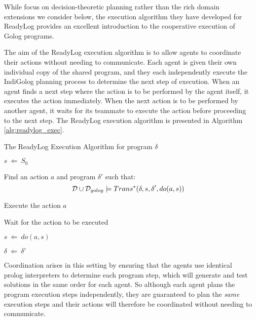 While \citeauthor{Ferrein2005readylog} focus on decision-theoretic
planning rather than the rich domain extensions we consider below,
the execution algorithm they have developed for ReadyLog provides
an excellent introduction to the cooperative execution of Golog programs.

The aim of the ReadyLog execution algorithm is to allow agents to
coordinate their actions without needing to communicate. Each agent
is given their own individual copy of the shared program, and they
each independently execute the IndiGolog planning process to determine
the next step of execution. When an agent finds a next step where
the action is to be performed by the agent itself, it executes the
action immediately. When the next action is to be performed by another
agent, it waits for its teammate to execute the action before proceeding
to the next step. The ReadyLog execution algorithm is presented in
Algorithm \ref{alg:readylog_exec}.

%
\begin{algorithm}[t]
\caption{The ReadyLog Execution Algorithm for program $\delta$}


\label{alg:readylog_exec} \begin{algorithmic}

\STATE $s\ \Leftarrow\ S_{0}$


\STATE Find an action $a$ and program $\delta'$ such that:\[
\mathcal{D}\cup\mathcal{D}_{golog}\models Trans^{*}(\delta,s,\delta',do(a,s))\]



\STATE Execute the action $a$

\ELSE

\STATE Wait for the action to be executed

\ENDIF

\STATE $s\ \Leftarrow\ do(a,s)$

\STATE $\delta\ \Leftarrow\ \delta'$

\ENDWHILE

\end{algorithmic} 
\end{algorithm}


Coordination arises in this setting by ensuring that the agents use
identical prolog interpreters to determine each program step, which
will generate and test solutions in the same order for each agent.
So although each agent plans the program execution steps independently,
they are guaranteed to plan the \emph{same} execution steps and their
actions will therefore be coordinated without needing to communicate.

